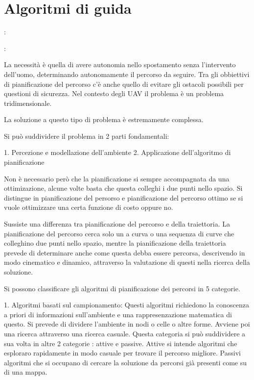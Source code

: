 \section{Algoritmi di guida}

\begin{idee}
	\cite{ElikerKaram2018AOPf}
	\cite{baseTesi}
	\cite{Mendoza-SotoJoséLuis2018Cgpc}
	\cite{PathPlannigOverview}
	
	
	\cite{YangLiang2016SoR3} : 
	
	\cite {Literature3dPath} : 
	
	La necessità è quella di avere autonomia nello spostamento senza l'intervento dell'uomo, determinando autonomamente il percorso da seguire.
	Tra gli obbiettivi di pianificazione del percorso c'è anche quello di evitare gli ostacoli possibili per questioni di sicurezza.
	Nel contesto degli UAV il problema è un problema tridimensionale.
	
	La soluzione a questo tipo di problema è estremamente complessa.
	
	Si può suddividere il problema in 2 parti fondamentali:
	
	1. Percezione e modellazione dell'ambiente
	2. Applicazione dell'algoritmo di pianificazione
	
	Non è necessario però che la pianificazione si sempre accompagnata da una ottimizazione, alcune volte basta che questa colleghi i due punti nello spazio.
	Si distingue in pianificazione del persorso e pianificazione del percorso ottimo se si vuole ottimizzare una certa funzione di costo oppure no.
	
	Sussiste una differenza tra pianificazione del percorso e della traiettoria. La pianificazione del percorso cerca solo un a curva o una sequenza di curve che colleghino due punti nello spazio, mentre la pianificazione della traiettoria prevede di determinare anche come questa debba essere percorsa, descrivendo in modo cinematico e dinamico, attraverso la valutazione di questi nella ricerca della soluzione.
	
	Si possono classificare gli algoritmi di pianificazione dei percorsi in 5 categorie.
	
	1. Algoritmi basati sul campionamento:
		Questi algoritmi richiedono la conoscenza a priori di informazioni sull'ambiente e una rappresenzazione matematica di questo. Si prevede di dividere l'ambiente in nodi o celle o altre forme. Avviene poi una ricerca attraverso una ricerca casuale. Questa categoria si può suddividere a sua volta in altre 2 categorie : attive e passive. Attive  si intende algoritmi che esploraro rapidamente in modo casuale per trovare il percorso migliore. Passivi algoritmi che si occupano di cercare la soluzione da percorsi già presenti come su di una mappa.
		

\end{idee}
